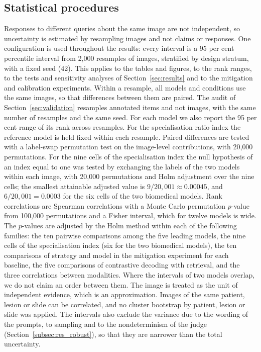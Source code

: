 \documentclass[11pt,a4paper]{article}
\begin{document}
\subsection{Statistical procedures}\label{sec:stats}
Responses to different queries about the same image are not independent, so uncertainty is estimated by resampling images and not claims or responses. One configuration is used throughout the results: every interval is a 95 per cent percentile interval from 2{,}000 resamples of images, stratified by design stratum, with a fixed seed (42). This applies to the tables and figures, to the rank ranges, to the tests and sensitivity analyses of Section~\ref{sec:results} and to the mitigation and calibration experiments. Within a resample, all models and conditions use the same images, so that differences between them are paired. The audit of Section~\ref{sec:validation} resamples annotated items and not images, with the same number of resamples and the same seed. For each model we also report the 95 per cent range of its rank across resamples. For the specialisation ratio index the reference model is held fixed within each resample. Paired differences are tested with a label-swap permutation test on the image-level contributions, with 20{,}000 permutations. For the nine cells of the specialisation index the null hypothesis of an index equal to one was tested by exchanging the labels of the two models within each image, with 20{,}000 permutations and Holm adjustment over the nine cells; the smallest attainable adjusted value is $9/20{,}001 \approx 0.00045$, and $6/20{,}001 = 0.0003$ for the six cells of the two biomedical models. Rank correlations are Spearman correlations with a Monte Carlo permutation $p$-value from 100{,}000 permutations and a Fisher interval, which for twelve models is wide. The $p$-values are adjusted by the Holm method within each of the following families: the ten pairwise comparisons among the five leading models, the nine cells of the specialisation index (six for the two biomedical models), the ten comparisons of strategy and model in the mitigation experiment for each baseline, the five comparisons of contrastive decoding with retrieval, and the three correlations between modalities. Where the intervals of two models overlap, we do not claim an order between them. The image is treated as the unit of independent evidence, which is an approximation. Images of the same patient, lesion or slide can be correlated, and no cluster bootstrap by patient, lesion or slide was applied. The intervals also exclude the variance due to the wording of the prompts, to sampling and to the nondeterminism of the judge (Section~\ref{subsec:res_robust}), so that they are narrower than the total uncertainty.
\end{document}
